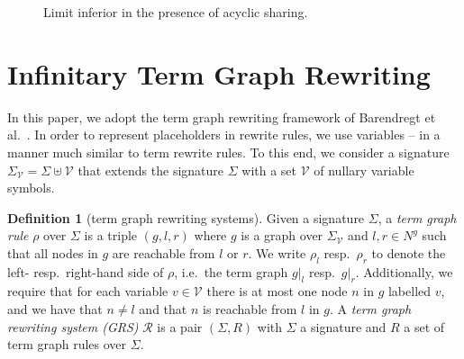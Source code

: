 \documentclass[copyright,creativecommons,UKenglish,final]{eptcs}
\newcommand\calR{\mathcal{R}}
\newcommand\calV{\mathcal{V}}
\newcommand\lhs[1]{#1_{l}}
\newcommand\rhs[1]{#1_{r}}
\newcommand\subgraph[2]{#1|_{#2}}
\theoremstyle{definition}
\newtheorem{definition}{Definition}[section]
\theoremstyle{plain}
\begin{document}
\begin{figure}
  \centering
  \caption{Limit inferior in the presence of acyclic sharing.}
  \label{fig:convWeird}
\end{figure}

\section{Infinitary Term Graph Rewriting}
\label{sec:infin-term-graph}

In this paper, we adopt the term graph rewriting framework of
Barendregt et al.~\cite{barendregt87parle}. In order to represent
placeholders in rewrite rules, we use variables -- in a manner much
similar to term rewrite rules. To this end, we consider a signature
$\Sigma_\calV = \Sigma\uplus\calV$ that extends the signature $\Sigma$
with a set $\calV$ of nullary variable symbols.
\begin{definition}[term graph rewriting systems]
  Given a signature $\Sigma$, a \emph{term graph rule} $\rho$ over
  $\Sigma$ is a triple $(g,l,r)$ where $g$ is a graph over
  $\Sigma_\calV$ and $l,r \in N^g$ such that all nodes in $g$ are
  reachable from $l$ or $r$. We write $\lhs\rho$ resp.\ $\rhs\rho$ to
  denote the left- resp.\ right-hand side of $\rho$, i.e.\ the term
  graph $\subgraph{g}{l}$ resp.\ $\subgraph{g}{r}$. Additionally, we
  require that for each variable $v\in\calV$ there is at most one node
  $n$ in $g$ labelled $v$, and we have that $n \neq l$ and that $n$ is
  reachable from $l$ in $g$.  A \emph{term graph rewriting system
    (GRS)} $\calR$ is a pair $(\Sigma,R)$ with $\Sigma$ a signature
  and $R$ a set of term graph rules over $\Sigma$.
\end{definition}
\end{document}
